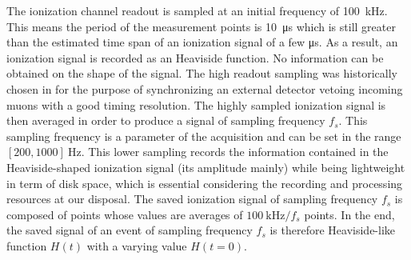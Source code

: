 The ionization channel readout is sampled at an initial frequency of \SI{100}{\kilo\Hz}. This means the period of the  measurement points is \SI{10}{\micro\s} which is still greater than the estimated time span of an ionization signal of a few \si{\micro\s}. As a result, an ionization signal is recorded as an Heaviside function. No information can be obtained on the shape of the signal. The high readout sampling was historically chosen in \Edelweiss{} for the purpose of synchronizing an external detector vetoing incoming muons with a good timing resolution. The highly sampled ionization signal is then averaged in order to produce a signal of sampling frequency $f_s$. This sampling frequency is a parameter of the acquisition and can be set in the range $[200, 1000]\ \si{\Hz}$. This lower sampling records the information contained in the Heaviside-shaped ionization signal (its amplitude mainly) while being lightweight in term of disk space, which is essential considering the recording and processing resources at our disposal. The saved ionization signal of sampling frequency $f_s$ is composed of points whose values are averages of $\SI{100}{\kilo\Hz}/f_s$ points. In the end, the saved signal of an event of sampling frequency $f_s$ is therefore Heaviside-like function $H(t)$ with a varying value $H(t=0)$.


